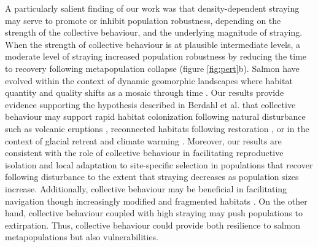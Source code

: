 \documentclass{revtex4}
\begin{document}
A particularly salient finding of our work was that density-dependent straying may serve to promote or inhibit population robustness, depending on the strength of the collective behaviour, and the underlying magnitude of straying.
When the strength of collective behaviour is at plausible intermediate levels, a moderate level of straying increased population robustness by reducing the time to recovery following metapopulation collapse (figure \ref{fig:pert}b). 
Salmon have evolved within the context of dynamic geomorphic landscapes where habitat quantity and quality shifts as a mosaic through time \citep{Stanford:2017bu}. 
Our results provide evidence supporting the hypothesis described in Berdahl et al. \citep{Berdahl:2014bl} that collective behaviour may support rapid habitat colonization following natural disturbance such as volcanic eruptions \citep{Leider:1989gx}, reconnected habitats following restoration \citep{Pess:2012by,Pess:2014isa}, or in the context of glacial retreat and climate warming \citep{Milner:2008gb}. 
Moreover, our results are consistent with the role of collective behaviour in facilitating reproductive isolation and local adaptation to site-specific selection in populations that recover following disturbance to the extent that straying decreases as population sizes increase. 
Additionally, collective behaviour may be beneficial in facilitating navigation though increasingly modified and fragmented habitats \citep{Berdahl:2017uu}. 
On the other hand, collective behaviour coupled with high straying may push populations to extirpation. 
Thus, collective behaviour could provide both resilience to salmon metapopulations but also vulnerabilities.  
\end{document}
